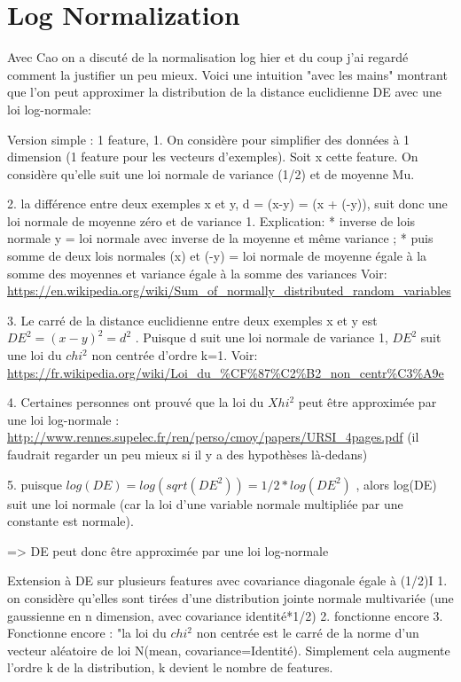 \chapter{Log Normalization}
\label{chap:publications}

Avec Cao on a discuté de la normalisation log hier et du coup j'ai regardé comment la justifier un peu mieux. Voici une intuition "avec les mains" montrant que l'on peut approximer la distribution de la distance euclidienne DE avec une loi log-normale:


Version simple : 1 feature, 
1. On considère pour simplifier des données à 1 dimension (1 feature pour les vecteurs d'exemples). Soit x cette feature. On considère qu'elle suit une loi normale de variance (1/2) et de moyenne Mu.

2. la différence entre deux exemples x et y,  d = (x-y) = (x + (-y)), suit donc une loi normale de moyenne zéro et de variance 1.  Explication:
* inverse de lois normale y = loi normale avec inverse de la moyenne et même variance ; 
* puis somme de deux lois normales (x) et (-y) = loi normale de moyenne égale à la somme des moyennes et variance égale à la somme des variances 
Voir: \url{https://en.wikipedia.org/wiki/Sum_of_normally_distributed_random_variables}

3. Le carré de la distance euclidienne entre deux exemples x et y est $DE^2 = (x-y)^2 = d^2$ . Puisque d suit une loi normale de variance 1, $DE^2$ suit une loi du $chi^2$ non centrée d'ordre k=1.
Voir: \url{https://fr.wikipedia.org/wiki/Loi_du_%CF%87%C2%B2_non_centr%C3%A9e}
	
	4. Certaines personnes ont prouvé que la loi du $Xhi^2$ peut être approximée par une loi log-normale : \url{http://www.rennes.supelec.fr/ren/perso/cmoy/papers/URSI_4pages.pdf}
	(il faudrait regarder un peu mieux si il y a des hypothèses là-dedans)
	
	5. puisque $log(DE) = log(sqrt(DE^2)) = 1/2*log(DE^2)$  , alors log(DE) suit une loi normale (car la loi d'une variable normale multipliée par une constante est normale). 
	
	=> DE peut donc être approximée par une loi log-normale
	
	
	Extension à DE sur plusieurs features avec covariance diagonale égale à (1/2)I
	1. on considère qu'elles sont tirées d'une distribution jointe normale multivariée (une gaussienne en n dimension, avec covariance identité*1/2)
	2. fonctionne encore 
	3. Fonctionne encore : "la loi du $chi^2$ non centrée est le carré de la norme d'un vecteur aléatoire de loi N(mean, covariance=Identité). Simplement cela augmente l'ordre k de la distribution, k devient le nombre de features.
	
